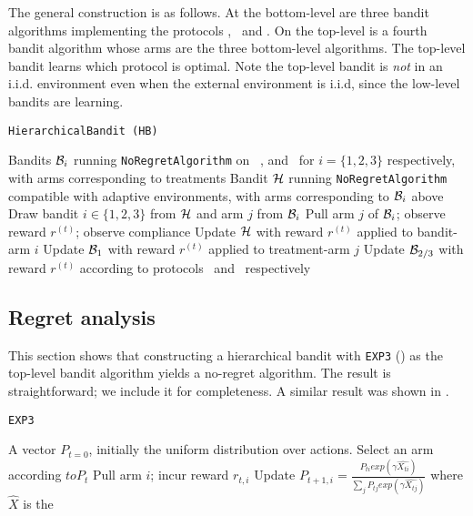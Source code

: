 The general construction is as follows. At the bottom-level are three bandit algorithms implementing the protocols \chosen, \actual\, and \comply. On the top-level is a fourth bandit algorithm whose arms are the three bottom-level algorithms. The top-level bandit learns which protocol is optimal. 
Note the top-level bandit is \emph{not} in an i.i.d. environment even when the external environment is i.i.d, since the low-level bandits are learning.
 
\begin{algorithm}
   \caption{\texttt{HierarchicalBandit (HB)}}
   \label{alg:hier-exp}
   \begin{algorithmic}   
   	 Bandits ${\mathcal B}_i$ running \texttt{NoRegretAlgorithm} on \comply\, \chosen, and \actual\, for $i =\{1,2,3\}$ respectively, with arms corresponding to treatments
   	 Bandit ${\mathcal H}$ running \texttt{NoRegretAlgorithm} compatible with adaptive environments, with arms corresponding to ${\mathcal B}_i$ above
	\STATE Draw bandit $i\in\{1,2,3\}$ from ${\mathcal H}$ and arm $j$ from ${\mathcal B}_i$
	\STATE Pull arm $j$ of ${\mathcal B}_i$; observe reward $r^{(t)}$; observe compliance
	\STATE Update ${\mathcal H}$ with reward $r^{(t)}$ applied to bandit-arm $i$
	\STATE Update ${\mathcal B}_1$ with reward $r^{(t)}$ applied to treatment-arm $j$
	\ENDIF
	\STATE Update ${\mathcal B}_{2/3}$ with reward $r^{(t)}$ according to protocols \chosen\, and \actual\, respectively
   	\ENDFOR

       	\end{algorithmic}
\end{algorithm}          

\subsection{Regret analysis}

This section shows that constructing a hierarchical bandit with \texttt{EXP3} (\cite{auer:02b}) as the top-level bandit algorithm yields a no-regret algorithm. The result is straightforward; we include it for completeness. A similar result was shown in \cite{chang:05}. 


\begin{algorithm}
   \caption{\texttt{EXP3}}
   \label{alg:exp3}
   \begin{algorithmic}   
   	A vector $P_{t=0}$, initially the uniform distribution over actions.
	\STATE Select an arm according $to P_{t}$
	\STATE Pull arm $i$; incur reward $r_{t,i}$
	\STATE Update $P_{t+1,i} = \frac{  P_{ti}  exp(\gamma \hat{X_{ti}}) }{  \sum_j P_{tj}  exp(\gamma \hat{X_{tj}}) }  $  where $\hat{X}$ is the 
    \ENDFOR
       	\end{algorithmic}
\end{algorithm}         
 
